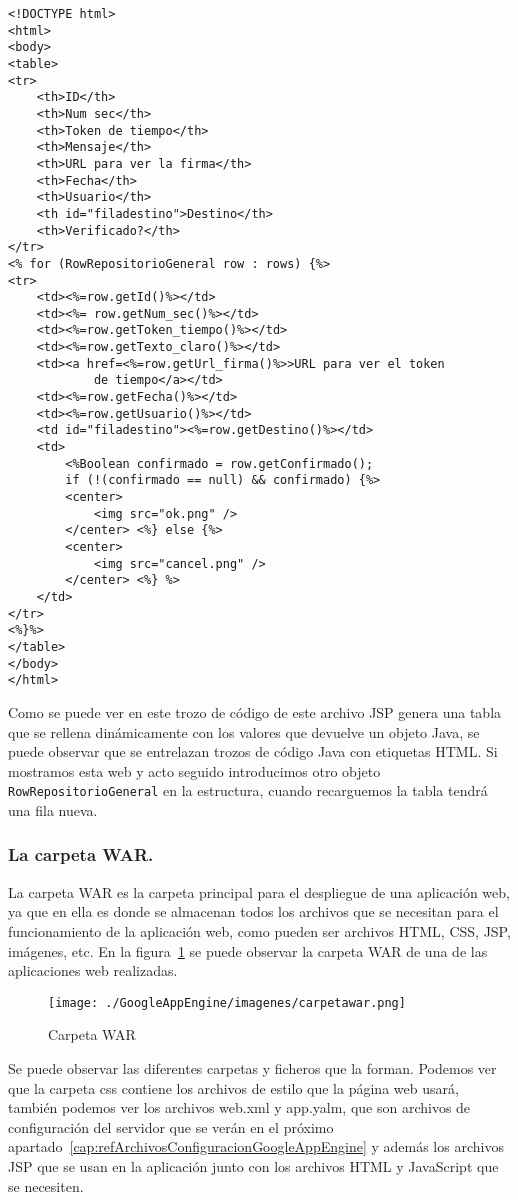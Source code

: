 \begin{lstlisting}[style=HTML]   
<!DOCTYPE html>
<html>
<body>
<table>
<tr>
	<th>ID</th>
	<th>Num sec</th>
	<th>Token de tiempo</th>
	<th>Mensaje</th>
	<th>URL para ver la firma</th>
	<th>Fecha</th>
	<th>Usuario</th>
	<th id="filadestino">Destino</th>
	<th>Verificado?</th>
</tr>
<% for (RowRepositorioGeneral row : rows) {%>
<tr>
	<td><%=row.getId()%></td>
	<td><%= row.getNum_sec()%></td>
	<td><%=row.getToken_tiempo()%></td>
	<td><%=row.getTexto_claro()%></td>
	<td><a href=<%=row.getUrl_firma()%>>URL para ver el token
			de tiempo</a></td>
	<td><%=row.getFecha()%></td>
	<td><%=row.getUsuario()%></td>
	<td id="filadestino"><%=row.getDestino()%></td>
	<td>
		<%Boolean confirmado = row.getConfirmado();
		if (!(confirmado == null) && confirmado) {%>
		<center>
			<img src="ok.png" />
		</center> <%} else {%>
		<center>
			<img src="cancel.png" />
		</center> <%} %>
	</td>
</tr>
<%}%>
</table>
</body>
</html>
\end{lstlisting}

Como se puede ver en este trozo de código de este archivo JSP genera una tabla que se rellena dinámicamente con los valores que devuelve un objeto Java, se puede observar que se entrelazan trozos de código Java con etiquetas HTML. Si mostramos esta web y acto seguido introducimos otro objeto \lstinline{RowRepositorioGeneral} en la estructura, cuando recarguemos la tabla tendrá una fila nueva.

\subsubsection{La carpeta WAR.}

La carpeta WAR es la carpeta principal para el despliegue de una aplicación web, ya que en ella es donde se almacenan todos los archivos que se necesitan para el funcionamiento de la aplicación web, como pueden ser archivos HTML, CSS, JSP, imágenes, etc. En la figura~\ref{fig:carpetawar} se puede observar la carpeta WAR de una de las aplicaciones web realizadas.

\begin{figure}
  \centering
    \texttt{[image: ./GoogleAppEngine/imagenes/carpetawar.png]}
  \caption{Carpeta WAR}
  \label{fig:carpetawar}
\end{figure}

Se puede observar las diferentes carpetas y ficheros que la forman. Podemos ver que la carpeta css contiene los archivos de estilo que la página web usará, también podemos ver los archivos web.xml y app.yalm, que son archivos de configuración del servidor que se verán en el próximo apartado~\ref{cap:refArchivosConfiguracionGoogleAppEngine} y además los archivos JSP que se usan en la aplicación junto con los archivos HTML y JavaScript que se necesiten.

